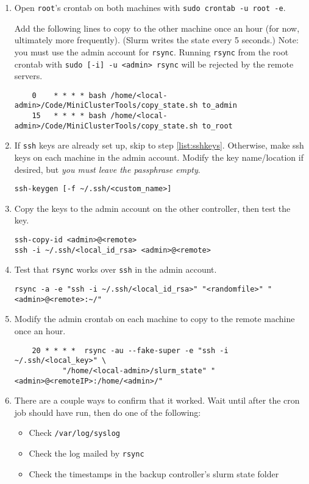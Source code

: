 \begin{enumerate}
\item Open \texttt{root}'s crontab on both machines with \texttt{sudo crontab -u root -e}.

	Add the following lines to copy to the other machine once an hour (for now, ultimately more frequently). (Slurm writes the state every 5 seconds.) Note: you must use the admin account for \texttt{rsync}. Running \texttt{rsync} from the root crontab with \texttt{sudo [-i] -u <admin> rsync} will be rejected by the remote servers.
	\begin{verbatim}
	0    * * * * bash /home/<local-admin>/Code/MiniClusterTools/copy_state.sh to_admin
	15   * * * * bash /home/<local-admin>/Code/MiniClusterTools/copy_state.sh to_root
	\end{verbatim}

\item If \texttt{ssh} keys are already set up, skip to step \ref{list:sshkeys}. Otherwise, make ssh keys on each machine in the admin account. Modify the key name/location if desired, but \emph{you must leave the passphrase empty}. 

	\texttt{ssh-keygen [-f \textasciitilde /.ssh/<custom\_name>]}

\item Copy the keys to the admin account on the other controller, then test the key.

	\texttt{ssh-copy-id <admin>@<remote>} \\
	\texttt{ssh -i \textasciitilde /.ssh/<local\_id\_rsa> <admin>@<remote>}

\item Test that \texttt{rsync} works over \texttt{ssh} in the admin account.

	\texttt{rsync -a -e "ssh -i \textasciitilde /.ssh/<local\_id\_rsa>" "<randomfile>" "<admin>@<remote>:\textasciitilde /"}

\item \label{list:sshkeys} Modify the admin crontab on each machine to copy to the remote machine once an hour.

	\begin{verbatim}
	20 * * * *  rsync -au --fake-super -e "ssh -i ~/.ssh/<local_key>" \
	       "/home/<local-admin>/slurm_state" "<admin>@<remoteIP>:/home/<admin>/"
	\end{verbatim}

\item There are a couple ways to confirm that it worked. Wait until after the cron job should have run, then do one of the following:
	\begin{itemize}
	\item Check \texttt{/var/log/syslog}
	\item Check the log mailed by \texttt{rsync}
	\item Check the timestamps in the backup controller's slurm state folder
	\end{itemize}


\end{enumerate}
